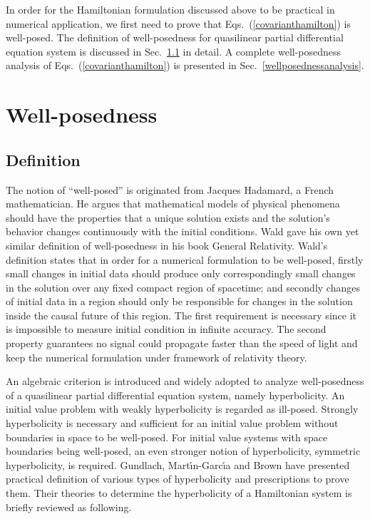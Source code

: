 In order for the Hamiltonian formulation discussed above to be practical in numerical application, we first need to prove that Eqs.~(\ref{covarianthamilton}) is well-posed. The definition of well-posedness for quasilinear partial differential equation system is discussed in Sec.~\ref{wellposednessdefinition} in detail. A complete well-posedness analysis of Eqs.~(\ref{covarianthamilton}) is presented in Sec.~\ref{wellposednessanalysis}.
\section{Well-posedness}\label{wellposedness}
\subsection{Definition}\label{wellposednessdefinition}
The notion of ``well-posed'' is originated from Jacques Hadamard, a French mathematician. He argues that mathematical models of physical phenomena should have the properties that a unique solution exists and the solution's behavior changes continuously with the initial conditions. Wald gave his own yet similar definition of well-posedness in his book General Relativity\cite{Wald:GRbook}. Wald's definition states that in order for a numerical formulation to be well-posed, firstly small changes in initial data should produce only correspondingly small changes in the solution over any fixed compact region of spacetime; and secondly changes of initial data in a region should only be responsible for changes in the solution inside the causal future of this region. The first requirement is necessary since it is impossible to measure initial condition in infinite accuracy. The second property guarantees no signal could propagate faster than the speed of light and keep the numerical formulation under framework of relativity theory. 

An algebraic criterion is introduced and widely adopted to analyze well-posedness of a quasilinear partial differential equation system, namely hyperbolicity. An initial value problem with weakly hyperbolicity is regarded as ill-posed. Strongly hyperbolicity is necessary and sufficient for an initial value problem without boundaries in space to be well-posed. For initial value systems with space boundaries being well-posed, an even stronger notion of hyperbolicity, symmetric hyperbolicity, is required. Gundlach, Mart\' \i n-Garc\' \i a\cite{Gundlach:2005ta} and Brown\cite{Brown:2008cca} have presented practical definition of various types of hyperbolicity and prescriptions to prove them. Their theories to determine the hyperbolicity of a Hamiltonian system is briefly reviewed as following. 

